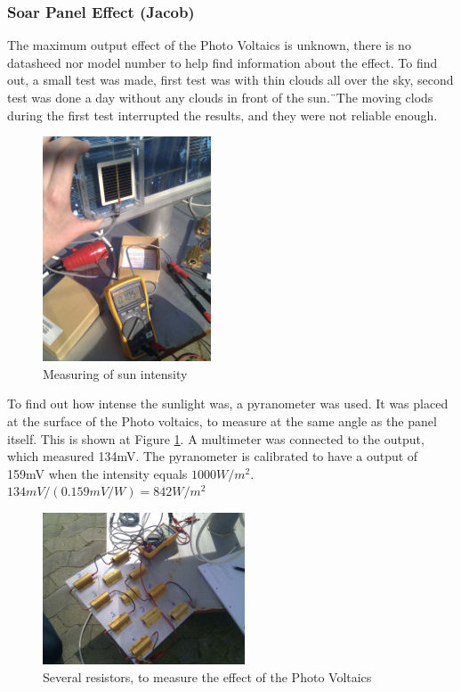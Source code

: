 \subsubsection{Soar Panel Effect (Jacob)}

The maximum output effect of the Photo Voltaics is unknown, there is no datasheed nor model number to help find information about the effect. To find out, a small test was made, first test was with thin clouds all over the sky, second test was done a day without any clouds in front of the sun.¨The moving clods during the first test interrupted the results, and they were not reliable enough.\\

\begin{figure}[H]
\centering
\includegraphics[width=5cm]{./img/sun_intensity}
\caption{Measuring of sun intensity}
\label{fig:sun_intensity}
\end{figure}

To find out how intense the sunlight was, a pyranometer was used. It was placed at the surface of the Photo voltaics, to measure at the same angle as the panel itself. This is shown at Figure \ref{fig:sun_intensity}. A multimeter was connected to the output, which measured 134mV. The pyranometer is calibrated to have a output of 159mV when the intensity equals $1000W/m^2$.\\
$134mV/(0.159mV/W)=842W/m^2$

\begin{figure}[H]
\centering
\includegraphics[width=6cm]{./img/IMG_20120326_140141}
\caption{Several resistors, to measure the effect of the Photo Voltaics}
\label{fig:IMG_20120326_140141}
\end{figure}


